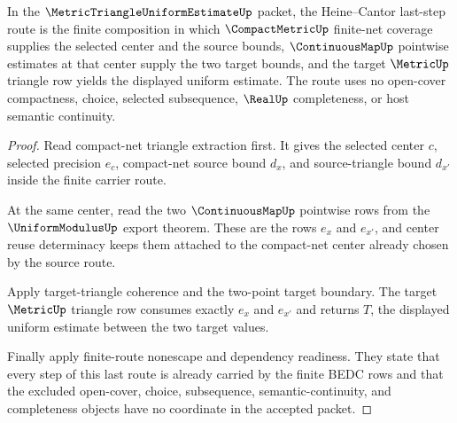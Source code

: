 \begin{theorem}
\label{thm:metric-triangle-uniform-estimate-heine-cantor-last-step}
In the $\MetricTriangleUniformEstimateUp$ packet, the Heine--Cantor last-step route is the finite composition in which $\CompactMetricUp$ finite-net coverage supplies the selected center and the source bounds, $\ContinuousMapUp$ pointwise estimates at that center supply the two target bounds, and the target $\MetricUp$ triangle row yields the displayed uniform estimate. The route uses no open-cover compactness, choice, selected subsequence, $\RealUp$ completeness, or host semantic continuity.
\end{theorem}
\begin{proof}
Read compact-net triangle extraction first. It gives the selected center $c$, selected precision $e_c$, compact-net source bound $d_x$, and source-triangle bound $d_{x'}$ inside the finite carrier route.

At the same center, read the two $\ContinuousMapUp$ pointwise rows from the $\UniformModulusUp$ export theorem. These are the rows $e_x$ and $e_{x'}$, and center reuse determinacy keeps them attached to the compact-net center already chosen by the source route.

Apply target-triangle coherence and the two-point target boundary. The target $\MetricUp$ triangle row consumes exactly $e_x$ and $e_{x'}$ and returns $T$, the displayed uniform estimate between the two target values.

Finally apply finite-route nonescape and dependency readiness. They state that every step of this last route is already carried by the finite BEDC rows and that the excluded open-cover, choice, subsequence, semantic-continuity, and completeness objects have no coordinate in the accepted packet.
\end{proof}


